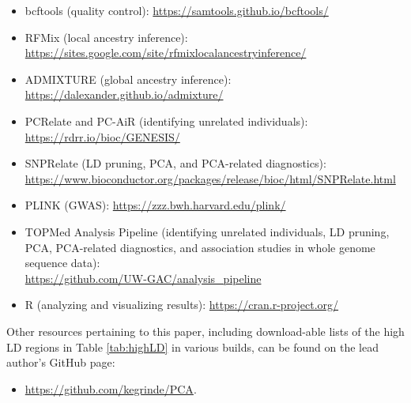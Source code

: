 \documentclass[12pt]{article}
\newcommand{\add}[1]{{\color{red}{[... #1 ...]}}}
\begin{document}
\begin{itemize}
\item bcftools \citep{bcftools} (quality control): \href{https://samtools.github.io/bcftools/}{https://samtools.github.io/bcftools/}
\item RFMix \citep{rfmix} (local ancestry inference):  \href{https://sites.google.com/site/rfmixlocalancestryinference/}{https://sites.google.com/site/rfmixlocalancestryinference/}
\item ADMIXTURE \citep{admixture} (global ancestry inference): \href{https://dalexander.github.io/admixture/}{https://dalexander.github.io/admixture/}
\item PCRelate \citep{conomos2016related} and PC-AiR \citep{conomos2015}
 (identifying unrelated individuals): \href{https://rdrr.io/bioc/GENESIS/}{https://rdrr.io/bioc/GENESIS/}
\item SNPRelate \citep{snprelate} (LD pruning, PCA, and PCA-related diagnostics): \\ \href{https://www.bioconductor.org/packages/release/bioc/html/SNPRelate.html}{https://www.bioconductor.org/packages/release/bioc/html/SNPRelate.html} 
\item PLINK \citep{plink} (GWAS): \href{https://zzz.bwh.harvard.edu/plink/}{https://zzz.bwh.harvard.edu/plink/}
\item TOPMed Analysis Pipeline (identifying unrelated individuals, LD pruning, PCA,  PCA-related diagnostics, and association studies in whole genome sequence data): \\ \href{https://github.com/UW-GAC/analysis_pipeline}{https://github.com/UW-GAC/analysis\_pipeline}
\item R (analyzing and visualizing results): \href{https://cran.r-project.org/}{https://cran.r-project.org/}
\end{itemize}

\noindent Other resources pertaining to this paper, including download-able lists of the high LD regions in Table \ref{tab:highLD} in various builds, can be found on the lead author's GitHub page: 
\begin{itemize}
\item \href{https://github.com/kegrinde/PCA}{https://github.com/kegrinde/PCA}.
\end{itemize}

\end{document}

